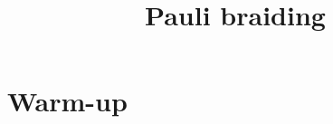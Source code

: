 



\part{Warm-up}
\label{book-part-warmup}

\title{Pauli braiding}
\label{chapter-paulibraiding}

\maketitle


\tableofcontents










